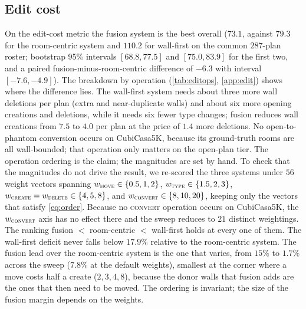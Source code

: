 \documentclass{article}
\begin{document}
\subsection{Edit cost}\label{sec:bench}
On the edit-cost metric the fusion system is the best overall ($73.1$, against
$79.3$ for the room-centric system and $110.2$ for wall-first on the common
$287$-plan roster; bootstrap 95\% intervals $[68.8,77.5]$ and $[75.0,83.9]$
for the first two, and a paired fusion-minus-room-centric difference of $-6.3$
with interval $[-7.6,-4.9]$). The breakdown by
operation (\cref{tab:editops}, \cref{app:edit}) shows where the difference
lies. The wall-first system needs about three more wall deletions per plan
(extra and near-duplicate walls) and about six more opening creations and
deletions, while it needs six fewer type changes; fusion reduces wall creations
from $7.5$ to $4.0$ per plan at the price of $1.4$ more deletions. No
open-to-phantom conversion occurs on CubiCasa5K, because its ground-truth rooms
are all wall-bounded; that operation only matters on the open-plan tier. The
operation ordering is the claim; the magnitudes are set by hand. To check that the magnitudes do not drive the
result, we re-scored the three systems under $56$ weight vectors spanning
$w_{\textsc{move}}\in\{0.5,1,2\}$, $w_{\textsc{type}}\in\{1.5,2,3\}$,
$w_{\textsc{create}}=w_{\textsc{delete}}\in\{4,5,8\}$, and
$w_{\textsc{convert}}\in\{8,10,20\}$, keeping only the vectors that satisfy
\cref{eq:order}. Because no \textsc{convert} operation occurs on CubiCasa5K, the
$w_{\textsc{convert}}$ axis has no effect there and the sweep reduces to $21$
distinct weightings. The ranking fusion $<$ room-centric $<$ wall-first holds at
every one of them. The wall-first deficit never falls below $17.9\%$
relative to the room-centric system. The fusion lead over the
room-centric system is the one that varies, from $15\%$ to $1.7\%$ across the
sweep ($7.8\%$ at the default weights), smallest at the corner where a move
costs half a create ($2,3,4,8$), because the donor walls
that fusion adds are the ones that then need to be moved. The ordering is
invariant; the size of the fusion margin depends on the weights.

\end{document}
